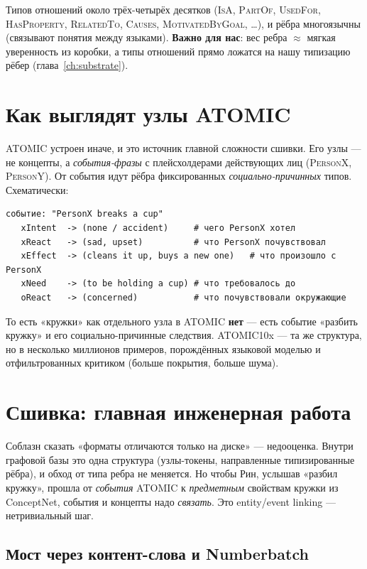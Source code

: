 Типов отношений около трёх-четырёх десятков (\textsc{IsA}, \textsc{PartOf},
\textsc{UsedFor}, \textsc{HasProperty}, \textsc{RelatedTo}, \textsc{Causes},
\textsc{MotivatedByGoal}, \dots), и рёбра многоязычны (связывают понятия между
языками). \textbf{Важно для нас}: вес ребра $\approx$ мягкая уверенность из коробки,
а типы отношений прямо ложатся на нашу типизацию рёбер (глава~\ref{ch:substrate}).

\section{Как выглядят узлы ATOMIC}

ATOMIC устроен иначе, и это источник главной сложности сшивки. Его узлы — не
концепты, а \emph{события-фразы} с плейсхолдерами действующих лиц
(\textsc{PersonX}, \textsc{PersonY}). От события идут рёбра фиксированных
\emph{социально-причинных} типов. Схематически:

\begin{lstlisting}[style=pseudo]
событие: "PersonX breaks a cup"
   xIntent  -> (none / accident)     # чего PersonX хотел
   xReact   -> (sad, upset)          # что PersonX почувствовал
   xEffect  -> (cleans it up, buys a new one)   # что произошло с PersonX
   xNeed    -> (to be holding a cup) # что требовалось до
   oReact   -> (concerned)           # что почувствовали окружающие
\end{lstlisting}

То есть «кружки» как отдельного узла в ATOMIC \textbf{нет} — есть событие «разбить
кружку» и его социально-причинные следствия. ATOMIC10x — та же структура, но в
несколько миллионов примеров, порождённых языковой моделью и отфильтрованных
критиком (больше покрытия, больше шума).

\section{Сшивка: главная инженерная работа}

Соблазн сказать «форматы отличаются только на диске» — недооценка. Внутри графовой
базы это одна структура (узлы-токены, направленные типизированные рёбра), и обход от
типа ребра не меняется. Но чтобы Рин, услышав «разбил кружку», прошла от
\emph{события} ATOMIC к \emph{предметным} свойствам кружки из ConceptNet, события и
концепты надо \emph{связать}. Это entity/event linking — нетривиальный шаг.

\subsection{Мост через контент-слова и Numberbatch}

